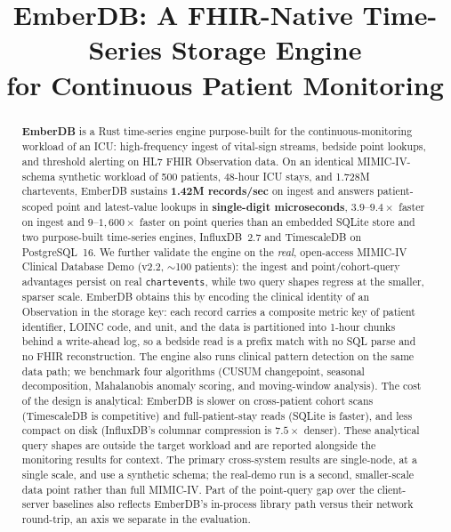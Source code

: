 \documentclass[journal]{IEEEtran}
\begin{document}
\title{EmberDB: A FHIR-Native Time-Series Storage Engine\\for Continuous Patient Monitoring}

\author{
}

\maketitle

\begin{abstract}
\textbf{EmberDB} is a Rust time-series engine purpose-built for the continuous-monitoring workload of an ICU: high-frequency ingest of vital-sign streams, bedside point lookups, and threshold alerting on HL7 FHIR Observation data. On an identical MIMIC-IV-schema synthetic workload of 500 patients, 48-hour ICU stays, and 1.728M chart\-events, EmberDB sustains \textbf{1.42M records/sec} on ingest and answers patient-scoped point and latest-value lookups in \textbf{single-digit microseconds}, $3.9$--$9.4\times$ faster on ingest and $9$--$1{,}600\times$ faster on point queries than an embedded SQLite store and two purpose-built time-series engines, InfluxDB~2.7 and TimescaleDB on PostgreSQL~16. We further validate the engine on the \emph{real}, open-access MIMIC-IV Clinical Database Demo (v2.2, $\sim$100 patients): the ingest and point/cohort-query advantages persist on real \texttt{chartevents}, while two query shapes regress at the smaller, sparser scale. EmberDB obtains this by encoding the clinical identity of an Observation in the storage key: each record carries a composite metric key of patient identifier, LOINC code, and unit, and the data is partitioned into 1-hour chunks behind a write-ahead log, so a bedside read is a prefix match with no SQL parse and no FHIR reconstruction. The engine also runs clinical pattern detection on the same data path; we benchmark four algorithms (CUSUM changepoint, seasonal decomposition, Mahalanobis anomaly scoring, and moving-window analysis). The cost of the design is analytical: EmberDB is slower on cross-patient cohort scans (TimescaleDB is competitive) and full-patient-stay reads (SQLite is faster), and less compact on disk (InfluxDB's columnar compression is $7.5\times$ denser). These analytical query shapes are outside the target workload and are reported alongside the monitoring results for context. The primary cross-system results are single-node, at a single scale, and use a synthetic schema; the real-demo run is a second, smaller-scale data point rather than full MIMIC-IV. Part of the point-query gap over the client-server baselines also reflects EmberDB's in-process library path versus their network round-trip, an axis we separate in the evaluation.
\end{abstract}
\end{document}
